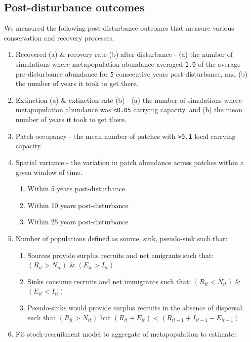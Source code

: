 \documentclass[]{article}
\providecommand{\tightlist}{%
  \setlength{\itemsep}{0pt}\setlength{\parskip}{0pt}}
\begin{document}
\hypertarget{post-disturbance-outcomes}{%
\subsection{Post-disturbance outcomes}\label{post-disturbance-outcomes}}

We measured the following post-disturbance outcomes that measure various
conservation and recovery processes.

\begin{enumerate}
\def\labelenumi{\arabic{enumi}.}
\item
  Recovered (a) \& recovery rate (b) after disturbance - (a) the number
  of simulations where metapopulation abundance averaged \texttt{1.0} of
  the average pre-disturbance abundance for \texttt{5} consecutive years
  post-disturbance, and (b) the number of years it took to get there.
\item
  Extinction (a) \& extinction rate (b) - (a) the number of simulations
  where metapopulation abundance was \texttt{\textless{}0.05} carrying
  capacity, and (b) the mean number of years it took to get there.
\item
  Patch occupancy - the mean number of patches with
  \texttt{\textgreater{}0.1} local carrying capacity.
\item
  Spatial variance - the variation in patch abundance across patches
  within a given window of time.

  \begin{enumerate}
  \def\labelenumii{\alph{enumii}.}
  \tightlist
  \item
    Within 5 years post-disturbance
  \item
    Within 10 years post-disturbance
  \item
    Within 25 years post-disturbance
  \end{enumerate}
\item
  Number of populations defined as source, sink, pseudo-sink such that:

  \begin{enumerate}
  \def\labelenumii{\alph{enumii}.}
  \tightlist
  \item
    Sources provide surplus recruits and net emigrants such that:
    \((R_{it}>N_{it})\) \& \((E_{it}>I_{it})\)
  \item
    Sinks consume recruits and net immigrants such that:
    \((R_{it} < N_{it})\) \& \((E_{it} < I_{it})\)
  \item
    Pseudo-sinks would provide surplus recruits in the absence of
    dispersal such that \((R_{it}>N_{it})\) but
    \((R_{it}+E_{it}) < (R_{it-1}+I_{it-1}-E_{it-1})\)
  \end{enumerate}
\item
  Fit stock-recruitment model to aggregate of metapopulation to
  estimate:


\end{enumerate}
\end{document}
